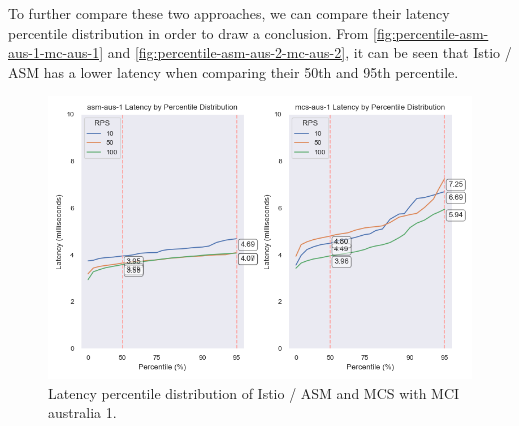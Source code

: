 To further compare these two approaches, we can compare their latency percentile distribution in order to draw a conclusion. From \autoref{fig:percentile-asm-aus-1-mc-aus-1} and \autoref{fig:percentile-asm-aus-2-mc-aus-2}, it can be seen that Istio / ASM has a lower latency when comparing their 50th and 95th percentile.

\begin{figure}
	\centering
	\includegraphics[width=1\textwidth]{assets/plots/percentile-asm-aus-1-mc-aus-1.png}
    \caption{Latency percentile distribution of Istio / ASM and MCS with MCI australia 1.}
	\label{fig:percentile-asm-aus-1-mc-aus-1}
\end{figure}



